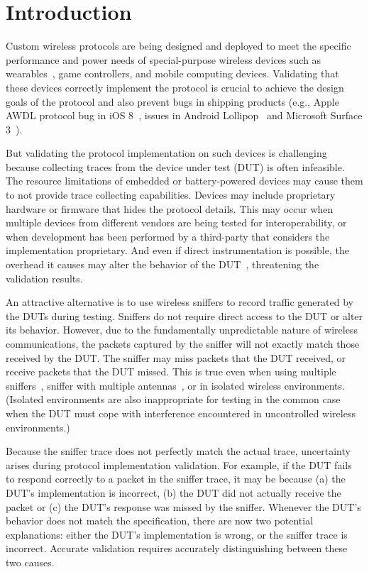
\section{Introduction}
\label{sec:intro}

Custom wireless protocols are being designed and deployed to meet the specific
performance and power needs of special-purpose wireless devices such as
wearables~\cite{iris}, game controllers, and mobile computing devices.
%
Validating that these devices correctly implement the protocol is crucial to
achieve the design goals of the protocol and also prevent bugs in shipping
products (e.g., Apple AWDL protocol bug in iOS 8~\cite{wifried}, \wifi{} issues
in Android Lollipop~\cite{lollipop} and Microsoft Surface 3~\cite{surface}).


But validating the protocol implementation on such devices is challenging
because collecting traces from the device under test (DUT) is often
infeasible.
%
The resource limitations of embedded or battery-powered devices may cause them
to not provide trace collecting capabilities.
%
Devices may include proprietary hardware or firmware that hides the protocol
details.
%
This may occur when multiple devices from different vendors are being tested
for interoperability, or when development has been performed by a third-party
that considers the implementation proprietary.
%
And even if direct instrumentation is possible, the overhead it causes may alter
the behavior of the DUT~\cite{mytkowicz2008observer}, threatening the validation
results.

An attractive alternative is to use wireless
sniffers to record traffic generated by the DUTs during testing.
%
Sniffers do not require direct access to the DUT or alter its behavior.
%
However, due to the fundamentally unpredictable nature of wireless
communications, the packets captured by the sniffer will not exactly match
those received by the DUT.
%
The sniffer may miss packets that the DUT received, or receive packets that
the DUT missed.
%
This is true even when using multiple
sniffers~\cite{cheng2006jigsaw,mahajan2006analyzing,bahl2006enhancing}, sniffer
with multiple antennas~\cite{omnipeek}, or in isolated wireless environments.
%
(Isolated environments are also inappropriate for testing in the common case
when the DUT must cope with interference encountered in uncontrolled wireless
environments.)

Because the sniffer trace does not perfectly match the actual trace,
uncertainty arises during protocol implementation validation.
%
For example, if the DUT fails to respond correctly to a packet in the sniffer
trace, it may be because (a) the DUT's implementation is incorrect, (b) the DUT
did not actually receive the packet or (c) the DUT's response was missed by the
sniffer.
%
Whenever the DUT's behavior does not match the specification, there are now two
potential explanations:
%
either the DUT's implementation is wrong, or the sniffer trace is incorrect.
%
Accurate validation requires accurately distinguishing between these two
causes.

